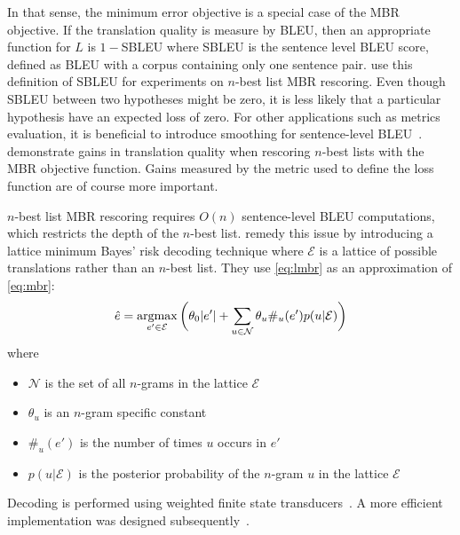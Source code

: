 In that sense, the minimum error objective is a special case of the
MBR objective.
If the translation quality is measure by
BLEU, then an appropriate function for $L$ is $1 - $SBLEU where SBLEU is the %
sentence level BLEU score, defined as BLEU with a corpus containing
only one sentence pair. \citet{kumar-byrne:2004:NAACL} use
this definition of SBLEU for experiments on $n$-best list
MBR rescoring. Even though
SBLEU between two hypotheses might be zero, it is less likely
that a particular hypothesis have an expected loss of zero.
For other applications such as metrics evaluation, it is beneficial
to introduce smoothing for sentence-level
BLEU~\citep{lin-och:2004:COLING}. %
\citet{kumar-byrne:2004:NAACL} demonstrate gains in translation quality
when rescoring $n$-best lists %
with the MBR objective function. Gains measured by the metric used
to define the loss function are of course more important.

$n$-best list MBR rescoring requires $O(n)$ sentence-level
BLEU computations, which restricts the depth of the $n$-best list.
\citet{tromble-kumar-och-macherey:2008:EMNLP} remedy this issue
by introducing a
lattice minimum Bayes' risk decoding technique where $\mathcal{E}$ is a lattice
of possible translations rather than an $n$-best list.
They use \autoref{eq:lmbr} as an approximation
of \autoref{eq:mbr}:
%
\begin{equation} \label{eq:lmbr}
  \hat{e} = \operatorname*{argmax}_{e' \in \mathcal{E}} \bigg ( \theta_0 |e'| + \sum_{u \in \mathcal{N}} \theta_u \#_u(e') p(u|\mathcal{E}) \bigg )
\end{equation}
%
where
%
\begin{itemize}
  \item $\mathcal{N}$ is the set of all $n$-grams in the lattice $\mathcal{E}$
  \item $\theta_u$ is an $n$-gram specific constant
  \item $\#_u(e')$ is the number of times $u$ occurs in $e'$
  \item $p(u|\mathcal{E})$ is the posterior probability of the $n$-gram $u$ in the lattice $\mathcal{E}$
\end{itemize}
%
Decoding is performed using weighted finite state
transducers~\citep{tromble-kumar-och-macherey:2008:EMNLP}. A more efficient
implementation was designed
subsequently~\citep{blackwood-degispert-byrne:2010:ACL,blackwood:2010:PHD}.

